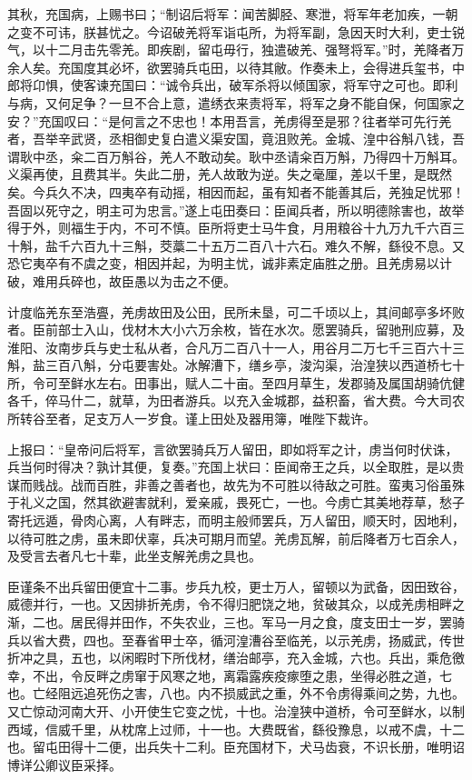 \documentclass[12pt,UTF8]{ctexbook}
\begin{document}
其秋，充国病，上赐书曰；“制诏后将军：闻苦脚胫、寒泄，将军年老加疾，一朝之变不可讳，朕甚忧之。今诏破羌将军诣屯所，为将军副，急因天时大利，吏士锐气，以十二月击先零羌。即疾剧，留屯毋行，独遣破羌、强弩将军。”时，羌降者万余人矣。充国度其必坏，欲罢骑兵屯田，以待其敝。作奏未上，会得进兵玺书，中郎将卬惧，使客谏充国曰：“诚令兵出，破军杀将以倾国家，将军守之可也。即利与病，又何足争？一旦不合上意，遣绣衣来责将军，将军之身不能自保，何国家之安？”充国叹曰：“是何言之不忠也！本用吾言，羌虏得至是邪？往者举可先行羌者，吾举辛武贤，丞相御史复白遣义渠安国，竟沮败羌。金城、湟中谷斛八钱，吾谓耿中丞，籴二百万斛谷，羌人不敢动矣。耿中丞请籴百万斛，乃得四十万斛耳。义渠再使，且费其半。失此二册，羌人故敢为逆。失之毫厘，差以千里，是既然矣。今兵久不决，四夷卒有动摇，相因而起，虽有知者不能善其后，羌独足忧邪！吾固以死守之，明主可为忠言。”遂上屯田奏曰：臣闻兵者，所以明德除害也，故举得于外，则福生于内，不可不慎。臣所将吏士马牛食，月用粮谷十九万九千六百三十斛，盐千六百九十三斛，茭藁二十五万二百八十六石。难久不解，繇役不息。又恐它夷卒有不虞之变，相因并起，为明主忧，诚非素定庙胜之册。且羌虏易以计破，难用兵碎也，故臣愚以为击之不便。



计度临羌东至浩亹，羌虏故田及公田，民所未垦，可二千顷以上，其间邮亭多坏败者。臣前部士入山，伐材木大小六万余枚，皆在水次。愿罢骑兵，留驰刑应募，及淮阳、汝南步兵与史士私从者，合凡万二百八十一人，用谷月二万七千三百六十三斛，盐三百八斛，分屯要害处。冰解漕下，缮乡亭，浚沟渠，治湟狭以西道桥七十所，令可至鲜水左右。田事出，赋人二十亩。至四月草生，发郡骑及属国胡骑伉健各千，倅马什二，就草，为田者游兵。以充入金城郡，益积畜，省大费。今大司农所转谷至者，足支万人一岁食。谨上田处及器用簿，唯陛下裁许。



上报曰：“皇帝问后将军，言欲罢骑兵万人留田，即如将军之计，虏当何时伏诛，兵当何时得决？孰计其便，复奏。”充国上状曰：臣闻帝王之兵，以全取胜，是以贵谋而贱战。战而百胜，非善之善者也，故先为不可胜以待敌之可胜。蛮夷习俗虽殊于礼义之国，然其欲避害就利，爱亲戚，畏死亡，一也。今虏亡其美地荐草，愁子寄托远遁，骨肉心离，人有畔志，而明主般师罢兵，万人留田，顺天时，因地利，以待可胜之虏，虽未即伏辜，兵决可期月而望。羌虏瓦解，前后降者万七百余人，及受言去者凡七十辈，此坐支解羌虏之具也。



臣谨条不出兵留田便宜十二事。步兵九校，更士万人，留顿以为武备，因田致谷，威德并行，一也。又因排折羌虏，令不得归肥饶之地，贫破其众，以成羌虏相畔之渐，二也。居民得并田作，不失农业，三也。军马一月之食，度支田士一岁，罢骑兵以省大费，四也。至春省甲士卒，循河湟漕谷至临羌，以示羌虏，扬威武，传世折冲之具，五也，以闲暇时下所伐材，缮治邮亭，充入金城，六也。兵出，乘危徼幸，不出，令反畔之虏窜于风寒之地，离霜露疾疫瘃堕之患，坐得必胜之道，七也。亡经阻远追死伤之害，八也。内不损威武之重，外不令虏得乘间之势，九也。又亡惊动河南大开、小开使生它变之忧，十也。治湟狭中道桥，令可至鲜水，以制西域，信威千里，从枕席上过师，十一也。大费既省，繇役豫息，以戒不虞，十二也。留屯田得十二便，出兵失十二利。臣充国材下，犬马齿衰，不识长册，唯明诏博详公卿议臣采择。
\end{document}
